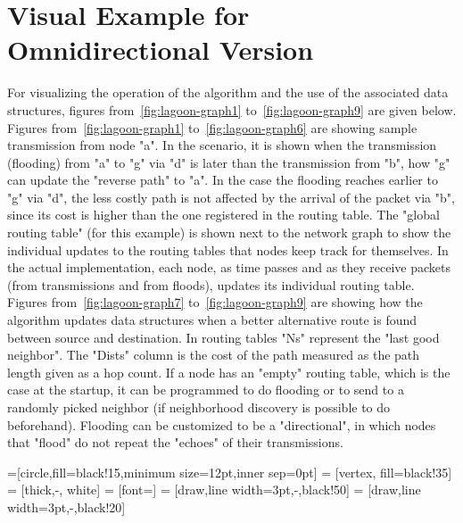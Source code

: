 \documentclass[12pt, oneandhalf, chaparabic, sees, ms]{metu}
\begin{document}
\pagebreak
\section{Visual Example for Omnidirectional Version}\label{svisexomni}

For visualizing the operation of the algorithm and the use of the associated data structures, figures from~\ref{fig:lagoon-graph1} to~\ref{fig:lagoon-graph9} are given below.
Figures from~\ref{fig:lagoon-graph1} to~\ref{fig:lagoon-graph6} are showing sample transmission from node "a". 
In the scenario, it is shown when the transmission (flooding) from "a" to "g" via "d" is later than the transmission from "b", how "g" can update the "reverse path" to "a".
In the case the flooding reaches earlier to "g" via "d", the less costly path is not affected by the arrival of the packet via "b", since its cost is higher than the one 
registered in the routing table.
The "global routing table" (for this example) is shown next to the network graph
to show the individual updates to the routing tables that nodes keep track for themselves. In the actual implementation, each node,
as time passes and as they receive packets (from transmissions and from floods), updates its individual routing table.
Figures from~\ref{fig:lagoon-graph7} to~\ref{fig:lagoon-graph9} are showing how the
algorithm updates data structures when a better alternative route is found between source and destination. In routing tables "Ns" represent the "last good neighbor". 
The "Dists" column is the cost of the path measured as the path length given as a hop count. If a node has an "empty" routing table, which is the case at the startup, it can be
programmed to do flooding or to send to a randomly picked neighbor (if neighborhood discovery is possible to do beforehand). Flooding can be customized to be a "directional", 
in which nodes that "flood" do not repeat the "echoes" of their transmissions.



=[circle,fill=black!15,minimum size=12pt,inner sep=0pt]
 = [vertex, fill=black!35]
 = [thick,-, white]
 = [font=\small]
 = [draw,line width=3pt,-,black!50]
 = [draw,line width=3pt,-,black!20]
\end{document}
